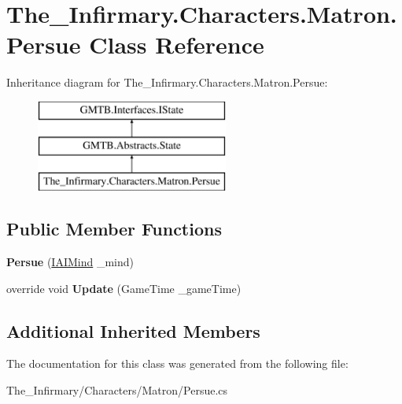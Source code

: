\hypertarget{class_the___infirmary_1_1_characters_1_1_matron_1_1_persue}{}\section{The\+\_\+\+Infirmary.\+Characters.\+Matron.\+Persue Class Reference}
\label{class_the___infirmary_1_1_characters_1_1_matron_1_1_persue}
Inheritance diagram for The\+\_\+\+Infirmary.\+Characters.\+Matron.\+Persue\+:\begin{figure}[H]
\begin{center}
\leavevmode
\includegraphics[height=3.000000cm]{class_the___infirmary_1_1_characters_1_1_matron_1_1_persue}
\end{center}
\end{figure}
\subsection*{Public Member Functions}
\begin{DoxyCompactItemize}
\item 
\mbox{\label{class_the___infirmary_1_1_characters_1_1_matron_1_1_persue_a7f5595b5785f621f1d3606da07fa58f3}} 
{\bfseries Persue} (\mbox{\hyperlink{interface_g_m_t_b_1_1_interfaces_1_1_i_a_i_mind}{I\+A\+I\+Mind}} \+\_\+mind)
\item 
\mbox{\label{class_the___infirmary_1_1_characters_1_1_matron_1_1_persue_a9faaac7bcaf4bb20fce0f0f5dbebf0e1}} 
override void {\bfseries Update} (Game\+Time \+\_\+game\+Time)
\end{DoxyCompactItemize}
\subsection*{Additional Inherited Members}


The documentation for this class was generated from the following file\+:\begin{DoxyCompactItemize}
\item 
The\+\_\+\+Infirmary/\+Characters/\+Matron/Persue.\+cs\end{DoxyCompactItemize}
